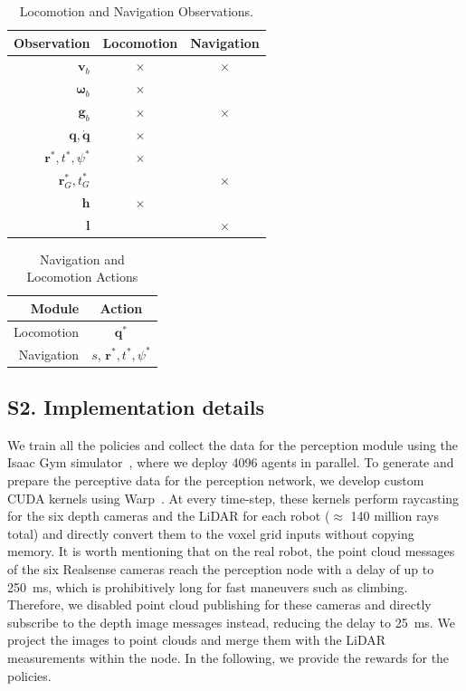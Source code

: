\documentclass[conference]{IEEEtran}
\begin{document}
\begin{table}[H]
\centering
\caption{Locomotion and Navigation Observations.}
\label{tab:observations}
\begin{tabular}{rcc}
\hline
 \textbf{Observation} & \textbf{Locomotion}  & \textbf{Navigation}     \\ \hline
$\mathbf{v}_b$ & $\times$ & $\times$ \\
$\boldsymbol{\omega}_b$ & $\times$ & {} \\
$\mathbf{g}_b$ & $\times$ & $\times$ \\
$\mathbf{q}, \dot{\mathbf{q}}$ & $\times$ & {} \\
$\mathbf{r}^*, t^*, \psi^*$ & $\times$ & {}\\
$\mathbf{r}_G^*, t_G^*$ & {} & $\times$\\
$\mathbf{h}$ & $\times$ & {}\\
$\mathbf{l}$ & {} & $\times$ \\
\hline
\end{tabular}
\end{table}

\begin{table}[H]
\centering
\caption{Navigation and Locomotion Actions}
\label{tab:actions}
\begin{tabular}{rc}
\hline
 \textbf{Module} & \textbf{Action}     \\ \hline
Locomotion &$\mathbf{q}^*$\\
Navigation & $s$, $\mathbf{r}^*, t^*, \psi^*$\\
\hline
\end{tabular}
\end{table}




\subsection*{S2. Implementation details}\label{app:impl_details}
We train all the policies and collect the data for the perception module using the Isaac Gym simulator~\cite{makoviychuk2021isaac}, where we deploy 4096 agents in parallel. To generate and prepare the perceptive data for the perception network, we develop custom CUDA kernels using Warp~\cite{macklin2022warp}. At every time-step, these kernels perform raycasting for the six depth cameras and the LiDAR for each robot ($\approx$ 140 million rays total) and directly convert them to the voxel grid inputs without copying memory. 
It is worth mentioning that on the real robot, the point cloud messages of the six Realsense cameras reach the perception node with a delay of up to \SI{250}{\milli\second}, which is prohibitively long for fast maneuvers such as climbing. Therefore, we disabled point cloud publishing for these cameras and directly subscribe to the depth image messages instead, reducing the delay to \SI{25}{\milli\second}. We project the images to point clouds and merge them with the LiDAR measurements within the node. 
In the following, we provide the rewards for the policies.
\end{document}
